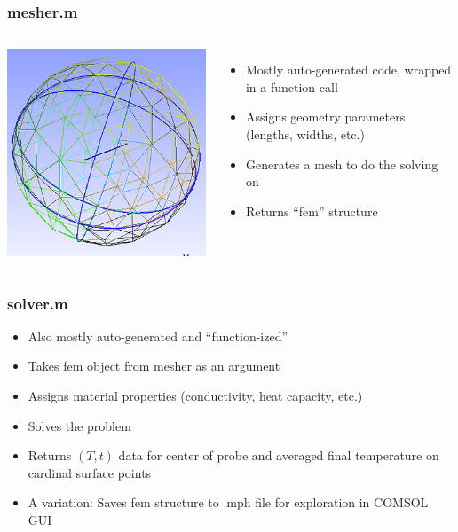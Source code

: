 \documentclass{beamer}
\begin{document}
\begin{frame}
\frametitle{mesher.m}
\begin{columns}[c]
    \includegraphics[width=\textwidth]{fig/example_mesh.png}
\begin{itemize}
    \item Mostly auto-generated code, wrapped in a function call
    \item Assigns geometry parameters (lengths, widths, etc.)
    \item Generates a mesh to do the solving on
    \item Returns ``fem'' structure
    \end{itemize}
\end{columns}
\end{frame}


\begin{frame}
\frametitle{solver.m}
\begin{itemize}
\item Also mostly auto-generated and ``function-ized''
\item Takes fem object from mesher as an argument
\item Assigns material properties (conductivity, heat capacity, etc.)
\item Solves the problem
\item Returns \((T,t)\) data for center of probe and averaged final temperature on 
cardinal surface points
\item A variation: Saves fem structure to .mph file for exploration in COMSOL GUI
\end{itemize}
\end{frame}
\end{document}

